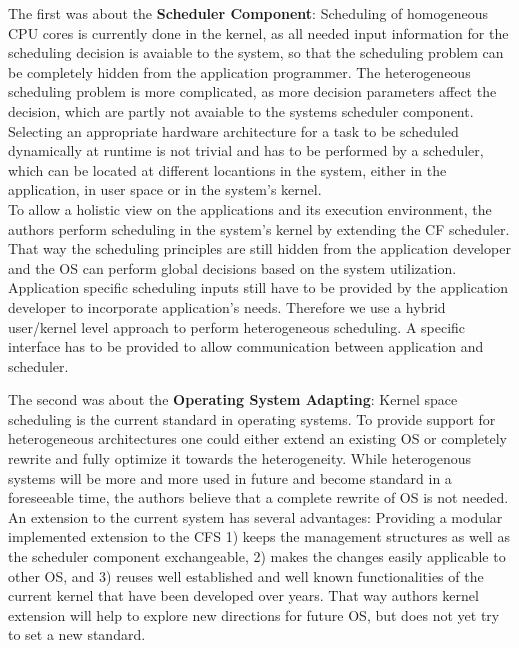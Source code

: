 \documentclass[a4paper,13pt]{article}
\begin{document}
\begin{multicols}{2}
The first was about the {\bf Scheduler Component}: Scheduling of homogeneous CPU cores is currently done in
the kernel, as all needed input information for the scheduling decision is avaiable to the system, 
so that the scheduling problem can be completely hidden from the application programmer. The 
heterogeneous scheduling problem is more complicated, as more decision parameters affect the decision,
which are partly not avaiable to the systems scheduler component.\\
Selecting an appropriate hardware architecture for a task to be scheduled dynamically at runtime
is not trivial and has to be performed  by a scheduler, which can be located at different locantions
in the system, either in the application, in user space or in the system's kernel.\\
To allow a holistic view on the applications and its execution environment, the authors perform scheduling in 
the system's kernel by extending the CF scheduler. That way the scheduling principles are still 
hidden from the application developer and the OS can perform global decisions based on the system
utilization. Application specific scheduling inputs still have to be provided by the application 
developer to incorporate application's needs. Therefore we use a hybrid user/kernel level approach
to perform heterogeneous scheduling. A specific interface has to be provided to allow communication
between  application and scheduler.

The second was about the {\bf Operating System Adapting}: Kernel space scheduling is the current standard
in operating systems. To provide support for heterogeneous architectures one could either extend an 
existing OS or completely rewrite and fully optimize it towards the heterogeneity. While heterogenous
systems will be more and more used in future and become standard in a foreseeable time, the authors
believe that a complete rewrite of OS is not needed. An extension to the current  system has several
advantages: Providing a modular implemented extension to the CFS 1) keeps the management structures
as well as the scheduler component exchangeable, 2) makes the changes easily applicable to other OS,
and 3) reuses well established and well known functionalities of the current  kernel that have been
developed over years. That way authors kernel extension will help to explore new directions for future OS,
but does not yet try to set a new standard.


\end{multicols}
\end{document}
